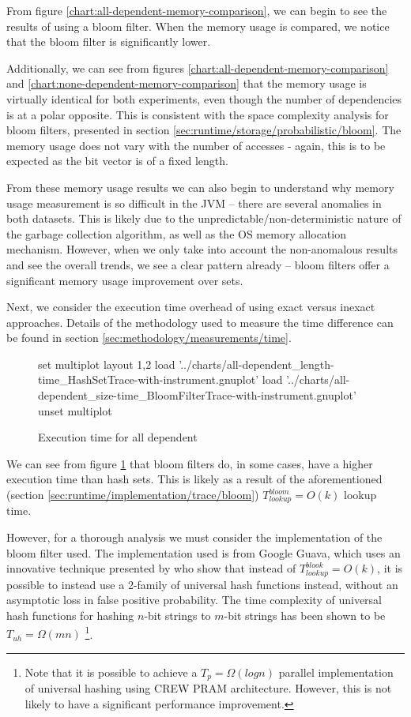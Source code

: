 	From figure \ref{chart:all-dependent-memory-comparison}, we can begin to see the results of using a bloom filter. When the memory usage is compared, we notice that the bloom filter is significantly lower.
	
	Additionally, we can see from figures \ref{chart:all-dependent-memory-comparison} and \ref{chart:none-dependent-memory-comparison} that the memory usage is virtually identical for both experiments, even though the number of dependencies is at a polar opposite. This is consistent with the space complexity analysis for bloom filters, presented in section \ref{sec:runtime/storage/probabilistic/bloom}. The memory usage does not vary with the number of accesses - again, this is to be expected as the bit vector is of a fixed length.
	
	From these memory usage results we can also begin to understand why memory usage measurement is so difficult in the JVM -- there are several anomalies in both datasets. This is likely due to the unpredictable/non-deterministic nature of the garbage collection algorithm, as well as the OS memory allocation mechanism. However, when we only take into account the non-anomalous results and see the overall trends, we see a clear pattern already -- bloom filters offer a significant memory usage improvement over sets.
	
	Next, we consider the execution time overhead of using exact versus inexact approaches. Details of the methodology used to measure the time difference can be found in section \ref{sec:methodology/measurements/time}.
	
	\begin{figure}
		\centering
		\begin{gnuplot}[terminal=pdf]
		set multiplot layout 1,2
			load '../charts/all-dependent_length-time_HashSetTrace-with-instrument.gnuplot'
			load '../charts/all-dependent_size-time_BloomFilterTrace-with-instrument.gnuplot'
		unset multiplot
		\end{gnuplot}
		\caption{Execution time for all dependent}
		\label{chart:all-dependent-time-comparison}
	\end{figure}
	
	We can see from figure \ref{chart:all-dependent-time-comparison} that bloom filters do, in some cases, have a higher execution time than hash sets. This is likely as a result of the aforementioned (section \ref{sec:runtime/implementation/trace/bloom}) $T_{lookup}^{bloom}=O(k)$ lookup time.
	
	However, for a thorough analysis we must consider the implementation of the bloom filter used. The implementation used is from Google Guava, which uses an innovative technique presented by \citet{Azar2006} who show that instead of $T_{lookup}^{blook}=O(k)$, it is possible to instead use a 2-family of universal hash functions instead, without an asymptotic loss in false positive probability. The time complexity of universal hash functions for hashing $n$-bit strings to $m$-bit strings has been shown to be $T_{uh}=\Omega(mn)$ \citep{Mansour1990}\footnote{Note that it is possible to achieve a $T_p=\Omega(log n)$ parallel implementation of universal hashing using CREW PRAM architecture. However, this is not likely to have a significant performance improvement.}.
	
